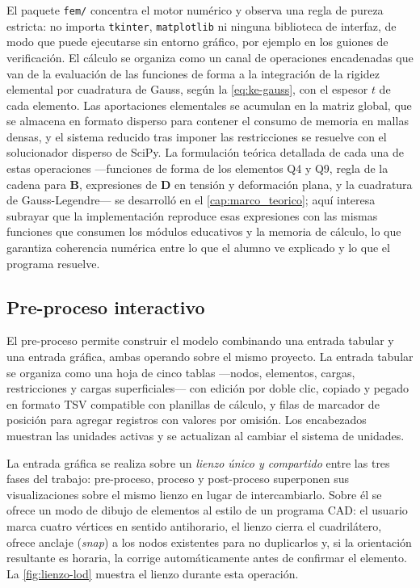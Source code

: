 El paquete \texttt{fem/} concentra el motor numérico y observa una regla de pureza estricta: no importa \texttt{tkinter}, \texttt{matplotlib} ni ninguna biblioteca de interfaz, de modo que puede ejecutarse sin entorno gráfico, por ejemplo en los guiones de verificación. El cálculo se organiza como un canal de operaciones encadenadas que van de la evaluación de las funciones de forma a la integración de la rigidez elemental por cuadratura de Gauss, según la \autoref{eq:ke-gauss}, con el espesor $t$ de cada elemento. Las aportaciones elementales se acumulan en la matriz global, que se almacena en formato disperso para contener el consumo de memoria en mallas densas, y el sistema reducido tras imponer las restricciones se resuelve con el solucionador disperso de SciPy. La formulación teórica detallada de cada una de estas operaciones —funciones de forma de los elementos Q4 y Q9, regla de la cadena para $\bm{B}$, expresiones de $\bm{D}$ en tensión y deformación plana, y la cuadratura de Gauss-Legendre— se desarrolló en el \autoref{cap:marco_teorico}; aquí interesa subrayar que la implementación reproduce esas expresiones con las mismas funciones que consumen los módulos educativos y la memoria de cálculo, lo que garantiza coherencia numérica entre lo que el alumno ve explicado y lo que el programa resuelve.

\subsection{Pre-proceso interactivo}
\label{sec:pre-proceso}

El pre-proceso permite construir el modelo combinando una entrada tabular y una entrada gráfica, ambas operando sobre el mismo proyecto. La entrada tabular se organiza como una hoja de cinco tablas —nodos, elementos, cargas, restricciones y cargas superficiales— con edición por doble clic, copiado y pegado en formato TSV compatible con planillas de cálculo, y filas de marcador de posición para agregar registros con valores por omisión. Los encabezados muestran las unidades activas y se actualizan al cambiar el sistema de unidades.

La entrada gráfica se realiza sobre un \emph{lienzo único y compartido} entre las tres fases del trabajo: pre-proceso, proceso y post-proceso superponen sus visualizaciones sobre el mismo lienzo en lugar de intercambiarlo. Sobre él se ofrece un modo de dibujo de elementos al estilo de un programa CAD: el usuario marca cuatro vértices en sentido antihorario, el lienzo cierra el cuadrilátero, ofrece anclaje (\emph{snap}) a los nodos existentes para no duplicarlos y, si la orientación resultante es horaria, la corrige automáticamente antes de confirmar el elemento. La \autoref{fig:lienzo-lod} muestra el lienzo durante esta operación.

